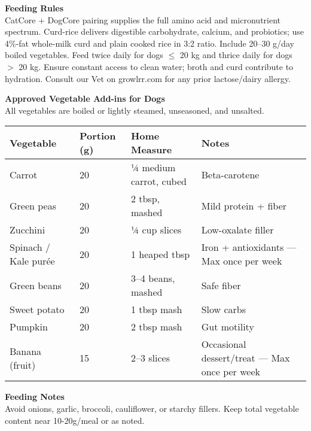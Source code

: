 \vspace{4mm}

\begin{flushleft}
\textbf{Feeding Rules}\\[2pt]
CatCore + DogCore pairing supplies the full amino acid and micronutrient spectrum. 
Curd-rice delivers digestible carbohydrate, calcium, and probiotics; use 4\%-fat whole-milk curd and plain cooked rice in 3:2 ratio. 
Include 20–30 g/day boiled vegetables. 
Feed twice daily for dogs $\leq$ 20 kg and thrice daily for dogs $>$ 20 kg. 
Ensure constant access to clean water; broth and curd contribute to hydration.
Consult our Vet on growlrr.com for any prior lactose/dairy allergy.
\end{flushleft}

\vspace{6mm}

\begin{flushleft}
\textbf{Approved Vegetable Add-ins for Dogs}\\[4pt]
All vegetables are boiled or lightly steamed, unseasoned, and unsalted.
\end{flushleft}

\vspace{3mm}

\begin{tabularx}{\linewidth}{@{} l l l X @{}}
\toprule
\textbf{Vegetable} & \textbf{Portion (g)} & \textbf{Home Measure} & \textbf{Notes}\\
\midrule
Carrot & 20 & ¼ medium carrot, cubed & Beta-carotene\\[3pt]
Green peas & 20 & 2 tbsp, mashed & Mild protein + fiber\\[3pt]
Zucchini & 20 & ¼ cup slices & Low-oxalate filler\\[3pt]
Spinach / Kale purée & 20 & 1 heaped tbsp & Iron + antioxidants ---Max once per week\\[3pt]
Green beans & 20 & 3–4 beans, mashed & Safe fiber\\[3pt]
Sweet potato & 20 & 1 tbsp mash & Slow carbs\\[3pt]
Pumpkin & 20 & 2 tbsp mash & Gut motility\\[3pt]
Banana (fruit) & 15 & 2–3 slices & Occasional dessert/treat --- Max once per week\\[3pt]
\bottomrule
\end{tabularx}

\vspace{4mm}

\begin{flushleft}
\textbf{Feeding Notes}\\[2pt]
Avoid onions, garlic, broccoli, cauliflower, or starchy fillers. 
Keep total vegetable content near 10-20g/meal or as noted. 
\end{flushleft}

